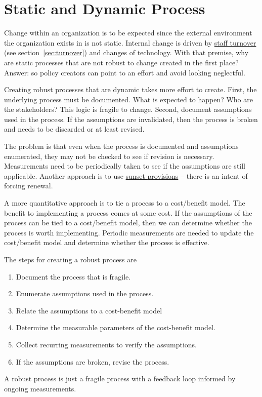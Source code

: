 \section{Static and Dynamic Process\label{sec:static-dynamic-processes}}


Change within an organization is to be expected since the external environment the organization exists in is not static. Internal change is driven by \hyperref[sec:turnover]{staff turnover} 
\ifsectionref
(see section~\ref{sec:turnover}) 
\fi
and changes of technology. With that premise, why are static processes that are not robust to change created in the first place? Answer: so policy creators can point to an effort and avoid looking neglectful.

Creating robust processes that are dynamic takes more effort to create. First, the underlying process must be documented. What is expected to happen? Who are the stakeholders? This logic is fragile to change. Second, document assumptions used in the process. If the assumptions are invalidated, then the process is broken and needs to be discarded or at least revised. 

The problem is that even when the process is documented and assumptions enumerated, they may not be checked to see if revision is necessary. Measurements need to be periodically taken to see if the assumptions are still applicable. Another approach is to use \href{https://en.wikipedia.org/wiki/Sunset_provision}{sunset provisions} -- there is an intent of forcing renewal. 

A more quantitative approach is to tie a process to a cost/benefit model. The benefit to implementing a process comes at some cost. If the assumptions of the process can be tied to a cost/benefit model, then we can determine whether the process is worth implementing. Periodic measurements are needed to update the cost/benefit model and determine whether the process is effective.

The steps for creating a robust process are
\begin{enumerate}
    \item Document the process that is fragile.
    \item Enumerate assumptions used in the process. 
    \item Relate the assumptions to a cost-benefit model
    \item Determine the measurable parameters of the cost-benefit model. 
    \item Collect recurring measurements to verify the assumptions. 
    \item If the assumptions are broken, revise the process. 
\end{enumerate}
A robust process is just a fragile process with a feedback loop informed by ongoing measurements. 